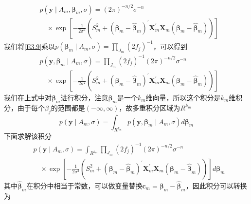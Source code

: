 \documentclass[12pt]{article} %
\begin{document}
	\begin{equation*}
		\begin{aligned}
			&p\left(\mathbf{y} \mid A_{m}, \boldsymbol{\beta}_{m}, \sigma\right)=(2 \pi)^{-n / 2} \sigma^{-n} \\
			&\quad \times \exp \left[-\frac{1}{2 \sigma^{2}}\left(S_{m}^{2}+\left(\boldsymbol{\beta}_{m}-\hat{\boldsymbol{\beta}}_{m}\right)^{\prime} \mathbf{X}_{m}^{\prime} \mathbf{X}_{m}\left(\boldsymbol{\beta}_{m}-\hat{\boldsymbol{\beta}}_{m}\right)\right)\right] 
		\end{aligned}
	\end{equation*}
	我们将\eqref{E3.9}乘以$p(\boldsymbol{\beta}_m \mid A_m,\sigma)=\prod_{J_{m}}\left(2 f_{j}\right)^{-1} $，可以得到
	\begin{equation*}
		\begin{aligned}
			&p\left(\mathbf{y}, \boldsymbol{\beta}_{m} \mid A_{m}, \sigma\right)=\prod_{J_{m}} \left(2 f_{j}\right)^{-1}  (2 \pi)^{-n / 2} \sigma^{-n} \\
			&\quad \times \exp \left[-\frac{1}{2 \sigma^{2}}\left(S_{m}^{2}+\left(\boldsymbol{\beta}_{m}-\hat{\boldsymbol{\beta}}_{m}\right)^{\prime} \mathbf{X}_{m}^{\prime} \mathbf{X}_{m}\left(\boldsymbol{\beta}_{m}-\hat{\boldsymbol{\beta}}_{m}\right)\right)\right] 
		\end{aligned}
	\end{equation*}
	我们在上式中对$\boldsymbol{\beta}_m$进行积分，注意$\boldsymbol{\beta}_m$是一个$k_m$维向量，所以这个积分是$k_m$维积分，由于每个$\beta_{j}$的范围都是$(-\infty,\infty)$，故多重积分区域为$R^{k_m}$
	\begin{equation*}
		p\left(\mathbf{y} \mid A_{m}, \sigma\right)= \int_{R^{k_m}} p\left(\mathbf{y}, \boldsymbol{\beta}_{m} \mid A_{m}, \sigma\right) d \boldsymbol{\beta}_{m}
	\end{equation*}
	下面求解该积分
	\begin{equation*}
		\begin{aligned}
			&p\left(\mathbf{y} \mid A_{m}, \sigma\right)=\int_{R^{k_m}}  \prod_{J_{m}} \left(2 f_{j}\right)^{-1}  (2 \pi)^{-n / 2} \sigma^{-n} \\
			&\quad \times \exp \left[-\frac{1}{2 \sigma^{2}}\left(S_{m}^{2}+\left(\boldsymbol{\beta}_{m}-\hat{\boldsymbol{\beta}}_{m}\right)^{\prime} \mathbf{X}_{m}^{\prime} \mathbf{X}_{m}\left(\boldsymbol{\beta}_{m}-\hat{\boldsymbol{\beta}}_{m}\right)\right)\right] d \boldsymbol{\beta}_m
		\end{aligned}
	\end{equation*}
	其中$\hat{\boldsymbol{\beta}}_{m}$在积分中相当于常数，可以做变量替换$\mathbf{c}_m = \boldsymbol{\beta}_m -\hat{\boldsymbol{\beta}}_m$，因此积分可以转换为
\end{document}
